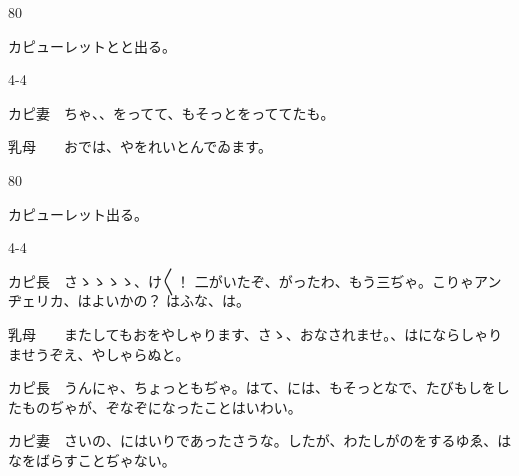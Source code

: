 \documentclass[tate,paper=b6j,jafontsize=9pt]{jlreq}
\begin{document}
\begin{azconvIndented}{8\zw}{0\zw}

カピューレットとと出る。

\end{azconvIndented}
\begin{azconvIndented}{4\zw}{-4\zw}

カピ妻　ちゃ、、をってて、もそっとをっててたも。

乳母　　おでは、やをれいとんでゐます。

\end{azconvIndented}
\begin{azconvIndented}{8\zw}{0\zw}

カピューレット出る。

\end{azconvIndented}
\begin{azconvIndented}{4\zw}{-4\zw}

カピ長　さゝゝゝゝ、け{〳〵}！ 二がいたぞ、がったわ、もう三ぢゃ。こりゃアンヂェリカ、はよいかの？ はふな、は。

乳母　　またしてもおをやしゃります、さゝ、おなされませ。、はにならしゃりませうぞえ、やしゃらぬと。

カピ長　うんにゃ、ちょっともぢゃ。はて、には、もそっとなで、たびもしをしたものぢゃが、ぞなぞになったことはいわい。

カピ妻　さいの、にはいりであったさうな。したが、わたしがのをするゆゑ、はなをばらすことぢゃない。

\end{azconvIndented}
\end{document}
